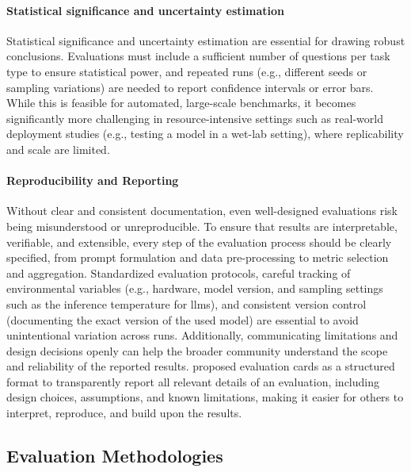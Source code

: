 \paragraph{Statistical significance and uncertainty estimation} Statistical significance and uncertainty estimation are essential for drawing robust conclusions. Evaluations must include a sufficient number of questions per task type to ensure statistical power, and repeated runs (e.g., different seeds or sampling variations) are needed to report confidence intervals or error bars. \autocite{tikhonov2023post} 
While this is feasible for automated, large-scale benchmarks, it becomes significantly more challenging in resource-intensive settings such as real-world deployment studies (e.g., testing a model in a wet-lab setting), where replicability and scale are limited.

\paragraph{Reproducibility and Reporting} Without clear and consistent documentation, even well-designed evaluations risk being misunderstood or unreproducible. 
To ensure that results are interpretable, verifiable, and extensible, every step of the evaluation process should be clearly specified, from prompt formulation and data pre-processing to metric selection and aggregation. 
Standardized evaluation protocols, careful tracking of environmental variables (e.g., hardware, model version, and sampling settings such as the inference temperature for \glspl{llm}), and consistent version control (documenting the exact version of the used model) are essential to avoid unintentional variation across runs. 
Additionally, communicating limitations and design decisions openly can help the broader community understand the scope and reliability of the reported results. 
\textcite{alampara2025lessons} proposed evaluation cards as a structured format to transparently report all relevant details of an evaluation, including design choices, assumptions, and known limitations, making it easier for others to interpret, reproduce, and build upon the results.


\subsection{Evaluation Methodologies}
\label{sec:eval_methods}
